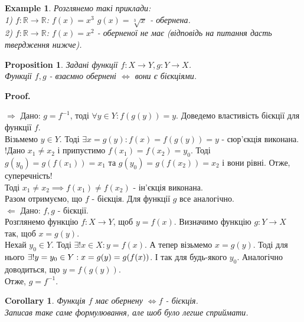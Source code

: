 \documentclass[a4paper, 14pt]{article}
\makeatletter
\def\qed{$\blacksquare$}
\def\rightproof{$\boxed{\Rightarrow}$ }
\def\leftproof{$\boxed{\Leftarrow}$ }
\theoremstyle{theoremdd}
\theoremstyle{theoremdd}
\theoremstyle{theoremdd}
\theoremstyle{theoremdd}
\newtheorem{example}[theorem]{Example}
\theoremstyle{theoremdd}
\newtheorem{proposition}[theorem]{Proposition}
\theoremstyle{theoremdd}
\theoremstyle{theoremdd}
\theoremstyle{theoremdd}
\newtheorem{corollary}[theorem]{Corollary}
\renewenvironment{proof}[1][Proof.\\]{\par
\pushQED{\hfill \qed}%
\normalfont \topsep6\p@\@plus6\p@\relax
\trivlist
\item\relax
{\bfseries
#1\@addpunct{.}}\hspace\labelsep\ignorespaces
}{%
\popQED\endtrivlist\@endpefalse
}
\makeatother
\begin{document}
	\begin{example} Розглянемо такі приклади:\\
	1) $f \colon \mathbb{R} \to \mathbb{R}$: \qquad $f(x) = x^3$ \qquad $g(x) = \sqrt[3]{x}$ - обернена. \\
	2) $f \colon \mathbb{R} \to \mathbb{R}$: \qquad
	$f(x) = x^2$ - оберненої не має (відповідь на питання дасть твердження нижче).
	\end{example}
	
	\begin{proposition}
	Задані функції $f \colon X \to Y, g \colon Y \to X$.\\
	Функції $f,g$ - взаємно обернені $\iff$ вони є бієкціями.
	\end{proposition}
	
	\begin{proof}
	\rightproof Дано: $g = f^{-1}$, тоді $\forall y \in Y: f(g(y)) = y$. Доведемо  властивість бієкції для функції $f$.\\
	Візьмемо $y \in Y$. Тоді $\exists x = g(y): f(x) = f(g(y)) = y$ - сюр'єкція виконана.\\
	!Дано $x_1 \neq x_2$ і припустимо $f(x_1) = f(x_2) = y_0$. Тоді $g(y_0) = g(f(x_1)) = x_1$ та $g(y_0) = g(f(x_2)) = x_2$ і вони рівні. Отже, суперечність!\\ Тоді $x_1 \neq x_2 \implies f(x_1) \neq f(x_2)$ - ін'єкція виконана.\\
	Разом отримуємо, що $f$ - бієкція. Для функції $g$ все аналогічно.
	\bigskip \\
	\leftproof Дано: $f,g$ - бієкції.\\
	Розглянемо функцію $f \colon X \to Y$, щоб $y = f(x)$. Визначимо функцію $g \colon Y \to X$ так, щоб $x = g(y)$.\\
	Нехай $y_0 \in Y$. Тоді $\exists! x \in X: y = f(x)$. А тепер візьмемо $x = g(y)$. Тоді для нього $\exists! y = y_0 \in Y: \\ x = g(y) = g(f(x))$. І так для будь-якого $y_0$. Аналогічно доводиться, що $y = f(g(y))$.\\
	Отже, $g = f^{-1}$.
	\end{proof}
	
	\begin{corollary}
	Функція $f$ має обернену $\iff f $ - бієкція.\\
	\textit{Записав таке саме формулювання, але шоб було легше сприймати.}
	\end{corollary}
	
\end{document}
